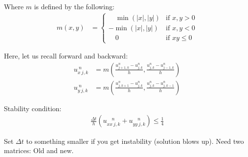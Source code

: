 Where $m$ is defined by the following:
%
\begin{align}
  m(x, y) & =
  \begin{cases}
    \quad \min(|x|, |y|)  & \text{if } x, y > 0\\
    -\min(|x|, |y|)       & \text{if } x, y < 0\\
    \quad 0               & \text{if } xy \leq 0
  \end{cases}
\end{align}

Here, let us recall forward and backward:
%
\begin{align}
  u^{\ n}_{x\ j, k} & = m(\frac{u^n_{j+1, k} - u^n_{j, k}}{h}, \frac{u^n_{j, k} - u^n_{j-1, k}}{h})\\
  u^{\ n}_{y\ j, k} & = m(\frac{u^n_{j, k+1} - u^n_{j, k}}{h}, \frac{u^n_{j, k} - u^n_{j, k - 1}}{h})
\end{align}

Stability condition:
%
\begin{align}
  \frac{\Delta t}{h} (u^{\quad n}_{xx\ j, k} + u^{\quad n}_{yy\ j, k}) \leq \frac{1}{4}
\end{align}

Set $\Delta t$ to something smaller if you get instability (solution blows up). Need two matrices: Old and new.

